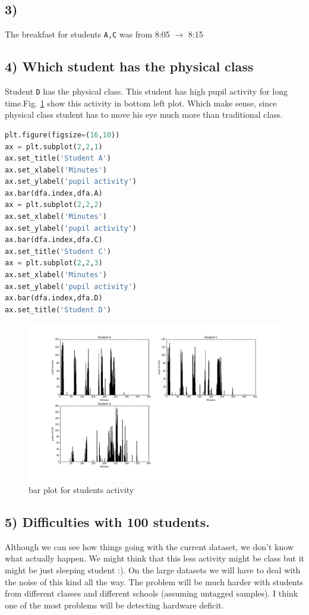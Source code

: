 \documentclass[10pt]{article}
\begin{document}
\subsection*{3)}
The breakfast for students \texttt{A,C} was from 8:05 \(\rightarrow\) 8:15
\subsection*{4) Which student has the physical class}
Student \texttt{D} has the physical class. This student has high pupil activity for long time.Fig. \ref{fig:2} show this activity in bottom left plot. Which make sense, since physical class student has to move his eye much more than traditional class.
\begin{lstlisting}[language=python]
plt.figure(figsize=(16,10))
ax = plt.subplot(2,2,1)
ax.set_title('Student A')
ax.set_xlabel('Minutes')
ax.set_ylabel('pupil activity')
ax.bar(dfa.index,dfa.A)
ax = plt.subplot(2,2,2)
ax.set_xlabel('Minutes')
ax.set_ylabel('pupil activity')
ax.bar(dfa.index,dfa.C)
ax.set_title('Student C')
ax = plt.subplot(2,2,3)
ax.set_xlabel('Minutes')
ax.set_ylabel('pupil activity')
ax.bar(dfa.index,dfa.D)
ax.set_title('Student D')
\end{lstlisting}

\begin{figure}[H]
\hspace{-70px}
\includegraphics[scale=0.5]{bar.png}
\caption{bar plot for students activity \label{fig:2}}
\end{figure}
\subsection*{5) Difficulties with 100 students.}
Although we can see how things going with the current dataset, we don't know what actually happen. We might think that this less activity might be class but it might be just sleeping student :). On the large datasets we will have to deal with the noise of this kind all the way. The problem will be much harder with students from different classes and different schools (assuming untagged samples). I think one of the most problems will be detecting hardware deficit.
\end{document}
